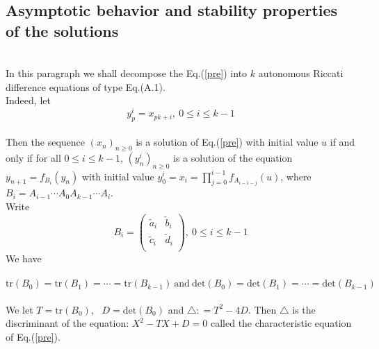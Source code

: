 \documentclass[11pt]{amsart}
\theoremstyle{definition}
\theoremstyle{remark}
\theoremstyle{example}
\numberwithin{equation}{section}
\begin{document}
\subsection{\bf Asymptotic behavior and stability properties of the solutions} \ \\

In this paragraph we shall decompose the Eq.(\ref{pre}) into $k$ autonomous Riccati difference equations of
type Eq.(A.1).\\
\noindent
Indeed, let $$y_p^i=x_{pk+i}, \ 0\leq i\leq k-1$$
\vspace{-3mm}
\\
Then the sequence $(x_n)_{n\geq0}$ is a solution of Eq.(\ref{pre})
with initial value $u$ if and only if for all $0\leq i\leq k-1$, $(y_n^i)_{n\geq0}$ is a solution of the equation $y_{n+1}=f_{B_i}(y_n)$ with initial value $y_0^i=x_i=\prod\limits_{j=0}^{i-1}f_{A_{i-1-j}}(u)$, where $B_i=A_{i-1}\cdots A_0A_{k-1}\cdots A_{i}$.\\

Write
$$B_i=\left(\begin{array}{cc}
\tilde{a}_i & \tilde{b}_i \\
\tilde{c}_i & \tilde{d}_i \\
\end{array}\right), \ 0\leq i\leq k-1$$
We have \\
\vspace{-3mm}
\\
$\textrm{tr}(B_0)=\textrm{tr}(B_1)=\cdots= \textrm{tr}(B_{k-1}) \ \text{and} \ \textrm{det}(B_0)=\textrm{det}(B_1)=\cdots=\textrm{det}(B_{k-1})$\\
\vspace{-2mm}
\\
We let $T=\textrm{tr}(B_0)$, \ $D=\textrm{det}(B_0)$ and $\triangle: =T^2-4D$. Then $\triangle$ is the discriminant of the equation: $X^2-TX+D=0$ called the characteristic equation of Eq.(\ref{pre}).\vspace{-2mm}\\
\end{document}
